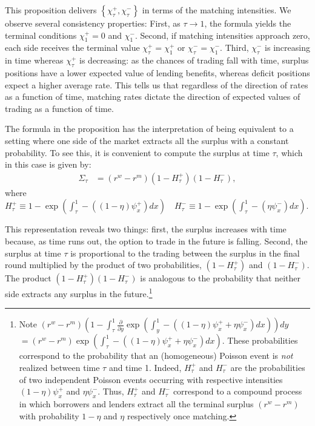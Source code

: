 \documentclass[12pt,american,english,notitlepage]{article}
\begin{document}
This proposition delivers $\left\{ \chi_{\tau}^{+},\chi_{\tau}^{-}\right\} $
in terms of the matching intensities. We observe several consistency
properties: First, as $\tau\rightarrow1$, the formula yields the
terminal conditions $\chi_{1}^{+}=0$ and $\chi_{1}^{-}$. Second,
if matching intensities approach zero, each side receives the terminal
value $\chi_{\tau}^{+}=\chi_{1}^{+}$ or $\chi_{\tau}^{-}=\chi_{1}^{-}$.
Third, $\chi_{\tau}^{-}$ is increasing in time whereas $\chi_{\tau}^{+}$
is decreasing: as the chances of trading fall with time,
surplus positions have a lower expected value of lending benefits,
whereas deficit positions expect a higher average rate. This tells
us that regardless of the direction of rates as a function of time, matching rates dictate the direction of expected values of trading
as a function of time.

The formula in the proposition has the interpretation of being equivalent
to a setting where one side of the market extracts all the surplus
with a constant probability. To see this, it is convenient to compute
the surplus at time $\tau$, which in this case is given by:
\begin{eqnarray*}
\Sigma_{\tau} 
& = 
 \left(r^{w}-r^{m}\right)\left(1-H_{\tau}^{+}\right)\left(1-H_{\tau}^{-}\right),
\end{eqnarray*}
where $H_{\tau}^{+}\equiv1-\exp\left(\int_{\tau}^{1}-\left(\left(1-\eta\right)\psi_{x}^{+}\right)dx\right)\quad H_{\tau}^{-}\equiv1-\exp\left(\int_{\tau}^{1}-\left(\eta\psi_{x}^{-}\right)dx\right).$

This representation reveals two things: first, the surplus increases
with time because, as time runs out, the option to trade in
the future is falling. Second, the surplus at time $\tau$ is proportional
to the trading between the surplus in the final round multiplied by
the product of two probabilities, $\left(1-H_{\tau}^{+}\right)$ and
$\left(1-H_{\tau}^{-}\right)$. The product $\left(1-H_{\tau}^{+}\right)\left(1-H_{\tau}^{-}\right)$
is analogous to the probability that neither side extracts any surplus
in the future.\footnote{Note
$\left(r^{w}-r^{m}\right)\left(1-\int_{\tau}^{1}\frac{\partial}{\partial y}\exp\left(\int_{y}^{1}-\left(\left(1-\eta\right)\psi_{x}^{+}+\eta\psi_{x}^{-}\right)dx\right)\right)dy$ $=\left(r^{w}-r^{m}\right)\exp\left(\int_{\tau}^{1}-\left(\left(1-\eta\right)\psi_{x}^{+}+\eta\psi_{x}^{-}\right)dx\right).$
These probabilities correspond to the probability that an (homogeneous)
Poisson event is \textit{not} realized between time $\tau$ and time
1. Indeed, $H_{\tau}^{+}$ and $H_{\tau}^{-}$ are the probabilities
of two independent Poisson events occurring with respective intensities
$\left(1-\eta\right)\psi_{x}^{+}$ and $\eta\psi_{x}^{-}$. Thus,
$H_{\tau}^{+}$ and $H_{\tau}^{-}$ correspond to a compound process
in which borrowers and lenders extract all the terminal surplus $\left(r^{w}-r^{m}\right)$
with probability $1-\eta$ and $\eta$ respectively once matching.}
\end{document}
